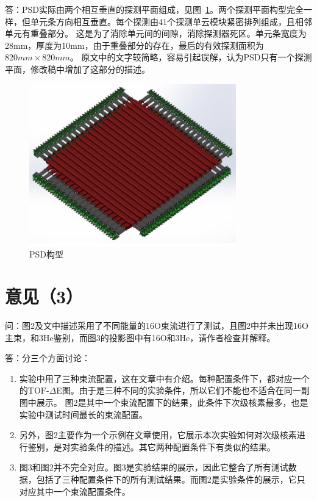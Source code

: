 \documentclass[UTF8]{ctexart}
\begin{document}
答：PSD实际由两个相互垂直的探测平面组成，见图~\ref{fig:psd}。两个探测平面构型完全一样，但单元条方向相互垂直。每个探测由41个探测单云模块紧密排列组成，且相邻单元有重叠部分。
这是为了消除单元间的间隙，消除探测器死区。单元条宽度为28mm，厚度为10mm，由于重叠部分的存在，最后的有效探测面积为$820mm\times820mm$。
原文中的文字较简略，容易引起误解，认为PSD只有一个探测平面，修改稿中增加了这部分的描述。

\begin{figure}[htp]
 \centering
 \includegraphics[width=0.8\textwidth]{psd.jpg}
 \caption{PSD构型}
 \label{fig:psd}
\end{figure}

\section{意见（3）}
问：图2及文中描述采用了不同能量的16O束流进行了测试，且图2中并未出现16O主束，和3He鉴别，而图3的投影图中有16O和3He，请作者检查并解释。

答：分三个方面讨论：
\begin{enumerate}
   \item 实验中用了三种束流配置，这在文章中有介绍。每种配置条件下，都对应一个的TOF-$\Delta$E图。由于是三种不同的实验条件，所以它们不能也不适合在同一副图中展示。
   图2是其中一个束流配置下的结果，此条件下次级核素最多，也是实验中测试时间最长的束流配置。
   \item 另外，图2主要作为一个示例在文章使用，它展示本次实验如何对次级核素进行鉴别，是对实验条件的描述。其它两种配置条件下有类似的结果。
   \item 图3和图2并不完全对应。图3是实验结果的展示，因此它整合了所有测试数据，包括了三种配置条件下的所有测试结果。而图2是实验条件的展示，它只对应其中一个束流配置条件。
  \end{enumerate}
\end{document}
